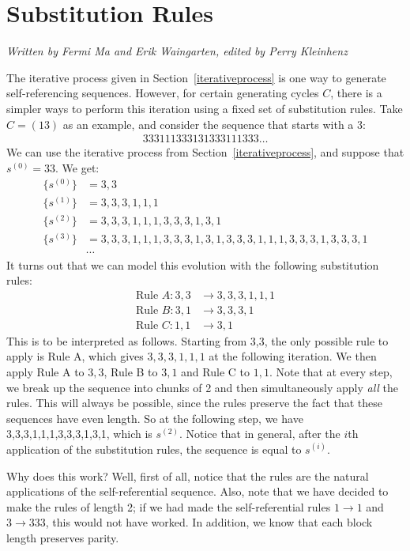 \documentclass[runningheads,a4paper]{llncs}
\begin{document}
\section{Substitution Rules}
\label{substitutionrules}

\emph{Written by Fermi Ma and Erik Waingarten, edited by Perry Kleinhenz}

The iterative process given in Section~\ref{iterativeprocess} is one way to generate self-referencing sequences. However, for certain generating cycles $C$, there is a simpler ways to perform this iteration using a fixed set of substitution rules. Take $C = (1 3)$ as an example, and consider the sequence that starts with a 3:
\begin{align*}
333111333131333111333\dots
\end{align*}
We can use the iterative process from Section~\ref{iterativeprocess}, and suppose that $s^{(0)} = 33$. We get:
\begin{align*}
\{s^{(0)}\} &= 3,3\\
\{s^{(1)}\} &= 3,3,3,1,1,1\\
\{s^{(2)}\} &= 3,3,3,1,1,1,3,3,3,1,3,1\\
\{s^{(3)}\} &= 3,3,3,1,1,1,3,3,3,1,3,1,3,3,3,1,1,1,3,3,3,1,3,3,3,1\\
&\cdots
\end{align*}
It turns out that we can model this evolution with the following substitution rules:
\begin{align*}
\text{Rule }A: 3,3 &\to 3,3,3,1,1,1 \\
\text{Rule }B: 3,1 &\to 3,3,3,1\\
\text{Rule }C: 1,1 &\to 3,1
\end{align*}
This is to be interpreted as follows. Starting from 3,3, the only possible rule to apply is Rule A, which gives $3,3,3,1,1,1$ at the following iteration. We then apply Rule A to $3,3$, Rule B to $3,1$ and Rule C to $1,1$. Note that at every step, we break up the sequence into chunks of 2 and then simultaneously apply \emph{all} the rules. This will always be possible, since the rules preserve the fact that these sequences have even length. So at the following step, we have 3,3,3,1,1,1,3,3,3,1,3,1, which is $s^{(2)}$. Notice that in general, after the $i$th application of the substitution rules, the sequence is equal to $s^{(i)}$.

Why does this work? Well, first of all, notice that the rules are the natural applications of the self-referential sequence. Also, note that we have decided to make the rules of length 2; if we had made the self-referential rules $1 \rightarrow 1$ and $3 \rightarrow 333$, this would not have worked. In addition, we know that each block length preserves parity. 
\end{document}
